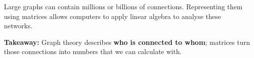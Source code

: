 Large graphs can contain millions or billions of connections. Representing them using matrices allows computers to apply linear algebra to analyse these networks.

\vspace{1em}
\begin{center}
\end{center}
\vspace{0.5em}

\textbf{Takeaway:} Graph theory describes \textbf{who is connected to whom}; matrices turn those connections into numbers that we can calculate with.

